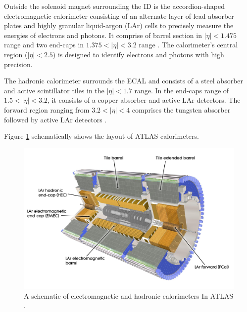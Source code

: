 Outside the solenoid magnet surrounding the ID is the accordion-shaped electromagnetic calorimeter consisting of an alternate layer of lead absorber plates and highly granular liquid-argon (LAr) cells to precisely measure the energies of electrons and photons. It comprise of barrel section in $|\eta| < 1.475$ range and two end-caps in $1.375 < |\eta| < 3.2$ range \cite{ATLAS_ECAL}. The calorimeter's central region ($|\eta| < 2.5$) is designed to identify electrons and photons with high precision.

The hadronic calorimeter surrounds the ECAL and consists of a steel absorber and active scintillator tiles in the $|\eta| < 1.7$ range. In the end-caps range of $1.5 < |\eta| < 3.2$, it consists of a copper absorber and active LAr detectors. The forward region ranging from $3.2 < |\eta| < 4$ comprises the tungsten absorber followed by active LAr detectors \cite{ATLAS_HCAL}. 

Figure \ref{fig:ATLAS_Cals} schematically shows the layout of ATLAS calorimeters. 

\begin{figure}
    \centering
    \includegraphics[width=.98\linewidth]{figures/LHC/ATLAS_CALO.jpeg}
    \caption{ A schematic of electromagnetic and hadronic calorimeters In ATLAS \cite{ATLAS}.\label{fig:ATLAS_Cals}}
\end{figure}

